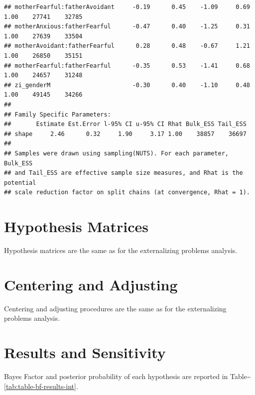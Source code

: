 \documentclass[
]{book}
\begin{document}
\begin{verbatim}
## motherFearful:fatherAvoidant     -0.19      0.45    -1.09     0.69 1.00    27741    32785
## motherAnxious:fatherFearful      -0.47      0.40    -1.25     0.31 1.00    27639    33504
## motherAvoidant:fatherFearful      0.28      0.48    -0.67     1.21 1.00    26850    35151
## motherFearful:fatherFearful      -0.35      0.53    -1.41     0.68 1.00    24657    31248
## zi_genderM                       -0.30      0.40    -1.10     0.48 1.00    49145    34266
## 
## Family Specific Parameters: 
##       Estimate Est.Error l-95% CI u-95% CI Rhat Bulk_ESS Tail_ESS
## shape     2.46      0.32     1.90     3.17 1.00    38857    36697
## 
## Samples were drawn using sampling(NUTS). For each parameter, Bulk_ESS
## and Tail_ESS are effective sample size measures, and Rhat is the potential
## scale reduction factor on split chains (at convergence, Rhat = 1).
\end{verbatim}

\hypertarget{hypothesis-matrices-1}{%
\section{Hypothesis Matrices}\label{hypothesis-matrices-1}}

Hypothesis matrices are the same as for the externalizing problems analysis.

\hypertarget{centering-and-adjusting-1}{%
\section{Centering and Adjusting}\label{centering-and-adjusting-1}}

Centering and adjusting procedures are the same as for the externalizing problems analysis.

\hypertarget{results-and-sensitivity-1}{%
\section{Results and Sensitivity}\label{results-and-sensitivity-1}}

Bayes Factor and posterior probability of each hypothesis are reported in Table\textasciitilde\ref{tab:table-bf-results-int}.
\end{document}
